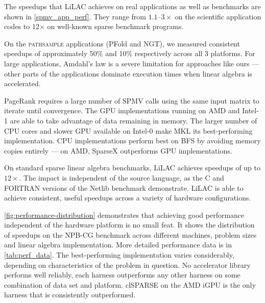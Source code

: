 The speedups that LiLAC achieves on real applications as well as benchmarks are
shown in \autoref{spmv_app_perf}.
They range from $1.1$--$3\times$ on the scientific application codes to
12$\times$ on well-known sparse benchmark programs.

On the \textsc{pathsample} applications (PFold and NGT), we measured
consistent speedups of approximately 50$\%$ and 10$\%$ respectively across
all 3 platforms.
For large applications, Amdahl's law is a severe limitation for
approaches like ours --- other parts of the applications dominate execution
times when linear algebra is accelerated.

PageRank requires a large number of SPMV calls using the same input matrix to
iterate until convergence.
The GPU implementations running on AMD and Intel-1 are able to take advantage of
data remaining in memory.
The larger number of CPU cores and slower GPU available on \mbox{Intel-0} make
MKL its best-performing implementation.
CPU implementations perform best on BFS by avoiding memory copies entirely
--- on AMD, SparseX outperforms GPU implementations.

On standard sparse linear algebra benchmarks, LiLAC achieves speedups of up to
$12\times$.
The impact is independent of the source language, as the C and FORTRAN versions
of the Netlib benchmark demonstrate.
LiLAC is able to achieve consistent, useful speedups across a variety of
hardware configurations.

    \autoref{fig:performance-distribution} demonstrates that achieving good
    performance independent of the hardware platform is no small feat.
    It shows the distribution of speedups on the NPB-CG benchmark across
    different machines, problem sizes and linear algebra implementation.
    More detailed performance data is in \autoref{tab:perf_data}.
    The best-performing implementation varies considerably, depending on
    characteristics of the problem in question.
    No accelerator library performs well reliably, each harness outperforms
    any other harness on some combination of data set and platform.
    clSPARSE on the AMD iGPU is the only harness that is consistently
    outperformed.

